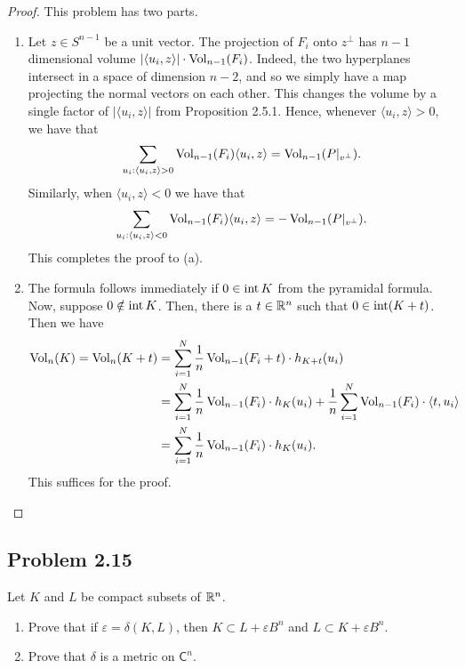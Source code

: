 \documentclass[12pt]{article}
\begin{document}
\begin{proof}
	This problem has two parts. 
	\begin{enumerate}[label = (\alph*)]
		\item Let $z \in S^{n-1}$ be a unit vector. The projection of $F_i$ onto $z^\perp$ has $n-1$ dimensional volume $|\langle u_i, z \rangle | \cdot \operatorname{Vol}_{n-1}(F_i)$. Indeed, the two hyperplanes intersect in a space of dimension $n-2$, and so we simply have a map projecting the normal vectors on each other. This changes the volume by a single factor of $|\langle u_i, z \rangle|$ from Proposition 2.5.1. Hence, whenever $\langle u_i, z \rangle > 0$, we have that 
		\[
			\sum_{u_i : \langle u_i, z \rangle > 0} \operatorname{Vol}_{n-1}(F_i) \langle u_i, z \rangle = \operatorname{Vol}_{n-1}(P|_{v^\perp}).
		\]
		Similarly, when $\langle u_i, z \rangle < 0$ we have that 
		\[
			\sum_{u_i : \langle u_i, z \rangle < 0} \operatorname{Vol}_{n-1}(F_i) \langle u_i, z \rangle = - \operatorname{Vol}_{n-1}(P|_{v^\perp}). 
		\]
		This completes the proof to (a). 

		\item The formula follows immediately if $0 \in \operatorname{int} K$ from the pyramidal formula. Now, suppose $0 \notin \operatorname{int} K$. Then, there is a $t \in \mathbb{R}^n$ such that $0 \in \operatorname{int} (K+t)$. Then we have 
		\begin{align*}
			\operatorname{Vol}_n(K) = \operatorname{Vol}_n(K+t) & = \sum_{i = 1}^N \frac{1}{n} \operatorname{Vol}_{n-1}(F_i + t) \cdot h_{K+t}(u_i) \\
			& = \sum_{i = 1}^N \frac{1}{n} \operatorname{Vol}_{n-1}(F_i) \cdot h_K(u_i) + \frac{1}{n} \sum_{i = 1}^N \operatorname{Vol}_{n-1}(F_i) \cdot \langle t, u_i \rangle \\
			& = \sum_{i = 1}^N \frac{1}{n} \operatorname{Vol}_{n-1}(F_i) \cdot h_K(u_i).
		\end{align*}
		This suffices for the proof. 
	\end{enumerate}
\end{proof}

\newpage 

\subsection{Problem 2.15}

\begin{problem}
	Let $K$ and $L$ be compact subsets of $\mathbb{R}^n$. 
    \begin{enumerate}[label = (\alph*)]
        \item Prove that if $\varepsilon = \delta(K, L)$, then $K \subset L + \varepsilon B^n$ and $L \subset K + \varepsilon B^n$.  

        \item Prove that $\delta$ is a metric on $\mathsf{C}^n$. 
    \end{enumerate}
\end{problem}
\end{document}
